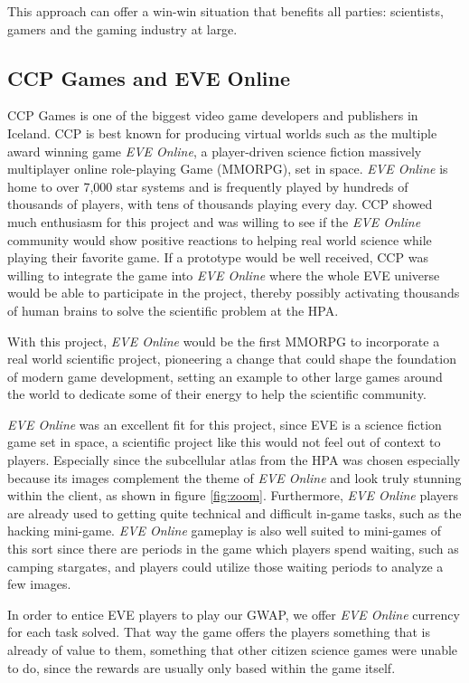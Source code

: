 This approach can offer a win-win situation that benefits all parties: scientists, gamers and the gaming industry at large.

\subsection{CCP Games and EVE Online}

CCP Games is one of the biggest video game developers and publishers in Iceland. CCP is best known for producing virtual worlds such as the multiple award winning game \emph{EVE Online}, a player-driven science fiction massively multiplayer online role-playing Game (MMORPG), set in space. \emph{EVE Online} is home to over 7,000 star systems and is frequently played by hundreds of thousands of players, with tens of thousands playing every day. CCP showed much enthusiasm for this project and was willing to see if the \emph{EVE Online} community would show positive reactions to helping real world science while playing their favorite game. If a prototype would be well received, CCP was willing to integrate the game into \emph{EVE Online} where the whole EVE universe would be able to participate in the project, thereby possibly activating thousands of human brains to solve the scientific problem at the HPA.

With this project, \emph{EVE Online} would be the first MMORPG to incorporate a real world scientific project, pioneering a change that could shape the foundation of modern game development, setting an example to other large games around the world to dedicate some of their energy to help the scientific community.

\emph{EVE Online} was an excellent fit for this project, since EVE is a science fiction game set in space, a scientific project like this would not feel out of context to players. Especially since the subcellular atlas from the HPA was chosen especially because its images complement the theme of \emph{EVE Online} and look truly stunning within the client, as shown in figure \ref{fig:zoom}. Furthermore, \emph{EVE Online} players are already used to getting quite technical and difficult in-game tasks, such as the hacking mini-game. \emph{EVE Online} gameplay is also well suited to mini-games of this sort since there are periods in the game which players spend waiting, such as camping stargates, and players could utilize those waiting periods to analyze a few images.

In order to entice EVE players to play our GWAP, we offer \emph{EVE Online} currency for each task solved. That way the game offers the players something that is already of value to them, something that other citizen science games were unable to do, since the rewards are usually only based within the game itself.

